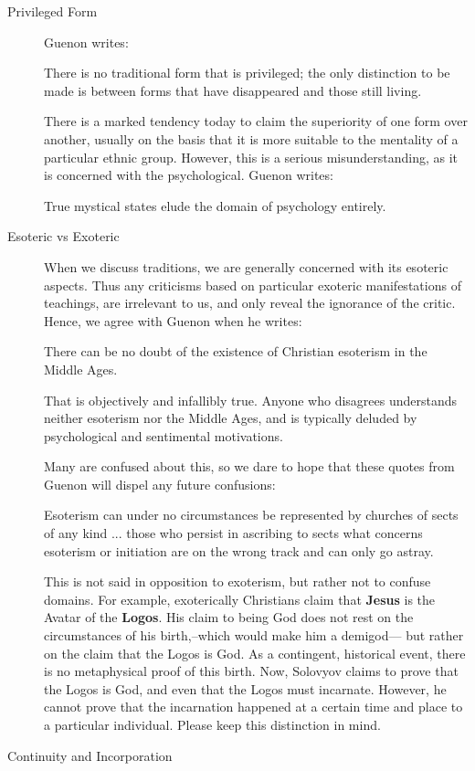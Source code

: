 \begin{description}

\item[Privileged Form]

Guenon writes:

\begin{quotex}
There is no traditional form that is privileged; the only distinction to be made is between forms that have disappeared and those still living.
\end{quotex}


There is a marked tendency today to claim the superiority of one form over another, usually on the basis that it is more suitable to the mentality of a particular ethnic group. However, this is a serious misunderstanding, as it is concerned with the psychological. Guenon writes:

\begin{quotex}
True mystical states elude the domain of psychology entirely.
\end{quotex}

\item[Esoteric vs Exoteric]

When we discuss traditions, we are generally concerned with its esoteric aspects. Thus any criticisms based on particular exoteric manifestations of teachings, are irrelevant to us, and only reveal the ignorance of the critic. Hence, we agree with Guenon when he writes:

\begin{quotex}
There can be no doubt of the existence of Christian esoterism in the Middle Ages.
\end{quotex}


That is objectively and infallibly true. Anyone who disagrees understands neither esoterism nor the Middle Ages, and is typically deluded by psychological and sentimental motivations.

Many are confused about this, so we dare to hope that these quotes from Guenon will dispel any future confusions:

\begin{quotex}
Esoterism can under no circumstances be represented by churches of sects of any kind ... those who persist in ascribing to sects what concerns esoterism or initiation are on the wrong track and can only go astray.
\end{quotex}


This is not said in opposition to exoterism, but rather not to confuse domains. For example, exoterically Christians claim that \textbf{Jesus} is the Avatar of the \textbf{Logos}. His claim to being God does not rest on the circumstances of his birth,--which would make him a demigod--- but rather on the claim that the Logos is God. As a contingent, historical event, there is no metaphysical proof of this birth. Now, Solovyov claims to prove that the Logos is God, and even that the Logos must incarnate. However, he cannot prove that the incarnation happened at a certain time and place to a particular individual. Please keep this distinction in mind.
\item[Continuity and Incorporation]


\end{description}
